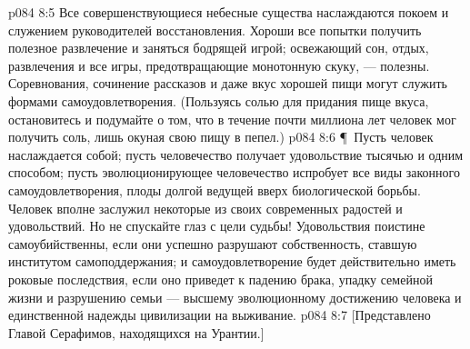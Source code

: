 \vs p084 8:5 Все совершенствующиеся небесные существа наслаждаются покоем и служением руководителей восстановления. Хороши все попытки получить полезное развлечение и заняться бодрящей игрой; освежающий сон, отдых, развлечения и все игры, предотвращающие монотонную скуку, --- полезны. Соревнования, сочинение рассказов и даже вкус хорошей пищи могут служить формами самоудовлетворения. (Пользуясь солью для придания пище вкуса, остановитесь и подумайте о том, что в течение почти миллиона лет человек мог получить соль, лишь окуная свою пищу в пепел.)
\vs p084 8:6 \P\ Пусть человек наслаждается собой; пусть человечество получает удовольствие тысячью и одним способом; пусть эволюционирующее человечество испробует все виды законного самоудовлетворения, плоды долгой ведущей вверх биологической борьбы. Человек вполне заслужил некоторые из своих современных радостей и удовольствий. Но не спускайте глаз с цели судьбы! Удовольствия поистине самоубийственны, если они успешно разрушают собственность, ставшую институтом самоподдержания; и самоудовлетворение будет действительно иметь роковые последствия, если оно приведет к падению брака, упадку семейной жизни и разрушению семьи --- высшему эволюционному достижению человека и единственной надежды цивилизации на выживание.
\vs p084 8:7 [Представлено Главой Серафимов, находящихся на Урантии.]
